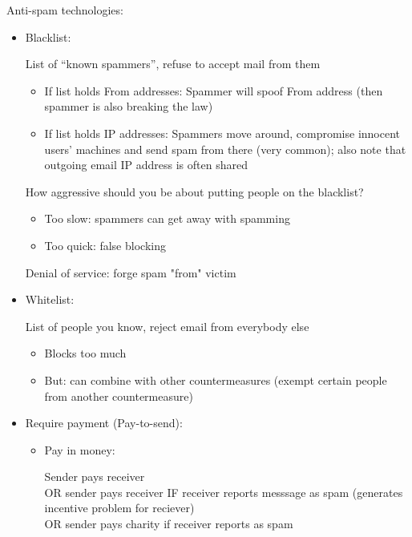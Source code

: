 Anti-spam technologies:
\begin{itemize}
    \item Blacklist:

        List of ``known spammers'', refuse to accept mail from them
        \begin{itemize}
            \item If list holds From addresses: Spammer will spoof From address
                (then spammer is also breaking the law)
            \item If list holds IP addresses: Spammers move around, compromise
                innocent users' machines and send spam from there (very common);
                also note that outgoing email IP address is often shared
        \end{itemize}
        How aggressive should you be about putting people on the blacklist?
        \begin{itemize}
            \item Too slow: spammers can get away with spamming
            \item Too quick: false blocking
        \end{itemize}
        Denial of service: forge spam "from" victim
    \item Whitelist:

        List of people you know, reject email from everybody else
        \begin{itemize}
            \item Blocks too much
            \item But: can combine with other countermeasures (exempt certain
                    people from another countermeasure)
        \end{itemize}
    \item Require payment (Pay-to-send):
        \begin{itemize}
            \item Pay in money:

                Sender pays receiver\\
                OR sender pays receiver IF receiver reports messsage as spam
                (generates incentive problem for reciever)\\
                OR sender pays charity if receiver reports as spam


\end{itemize}
\end{itemize}
